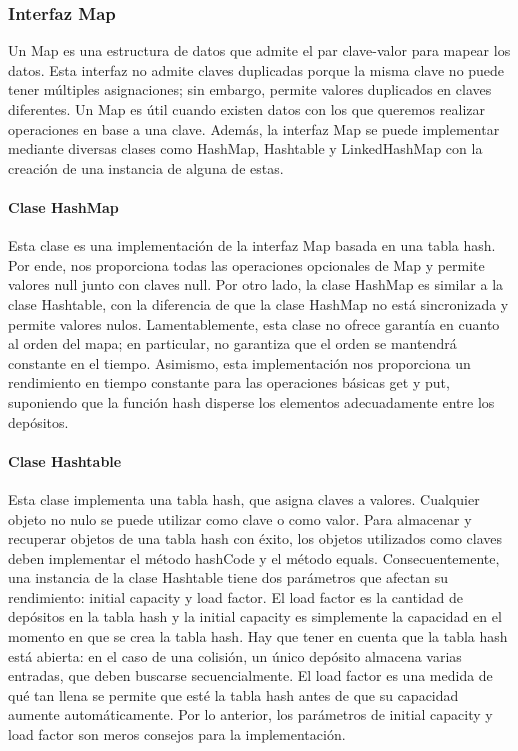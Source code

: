 \documentclass{report}
\begin{document}
\subsubsection{Interfaz Map}
Un Map es una estructura de datos que admite el par clave-valor para mapear los datos. Esta interfaz no admite claves duplicadas porque la misma clave no puede tener múltiples asignaciones; sin embargo, permite valores duplicados en claves diferentes. Un Map es útil cuando existen datos con los que queremos realizar operaciones en base a una clave. Además, la interfaz Map se puede implementar mediante diversas clases como HashMap, Hashtable y LinkedHashMap con la creación de una instancia de alguna de estas.
\paragraph{Clase HashMap}
Esta clase es una implementación de la interfaz Map basada en una tabla hash. Por ende, nos proporciona todas las operaciones opcionales de Map y permite valores null junto con claves null. Por otro lado, la clase HashMap es similar a la clase Hashtable, con la diferencia de que la clase HashMap no está sincronizada y permite valores nulos. Lamentablemente, esta clase no ofrece garantía en cuanto al orden del mapa; en particular, no garantiza que el orden se mantendrá constante en el tiempo.
Asimismo, esta implementación nos proporciona un rendimiento en tiempo constante para las operaciones básicas get y put, suponiendo que la función hash disperse los elementos adecuadamente entre los depósitos.
\paragraph{Clase Hashtable}
Esta clase implementa una tabla hash, que asigna claves a valores. Cualquier objeto no nulo se puede utilizar como clave o como valor. Para almacenar y recuperar objetos de una tabla hash con éxito, los objetos utilizados como claves deben implementar el método hashCode y el método equals.
Consecuentemente, una instancia de la clase Hashtable tiene dos parámetros que afectan su rendimiento: initial capacity y load factor. El load factor es la cantidad de depósitos en la tabla hash y la initial capacity es simplemente la capacidad en el momento en que se crea la tabla hash. Hay que tener en cuenta que la tabla hash está abierta: en el caso de una colisión, un único depósito almacena varias entradas, que deben buscarse secuencialmente. El load factor es una medida de qué tan llena se permite que esté la tabla hash antes de que su capacidad aumente automáticamente. Por lo anterior, los parámetros de initial capacity y load factor son meros consejos para la implementación.
\end{document}
